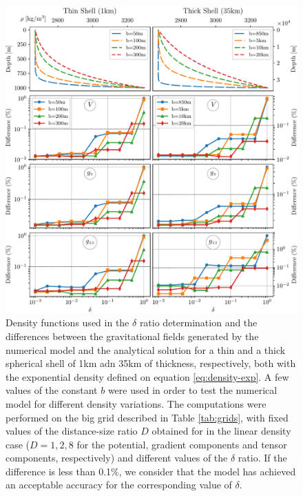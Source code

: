 \documentclass[extra]{gji}
\begin{document}
\begin{figure}
\centering
\includegraphics[width=\linewidth]{figures/exponential-delta.pdf}
\caption{
    Density functions used in the $\delta$ ratio determination and the 
    differences between the gravitational fields generated by the 
    numerical model and the analytical solution for a thin and a thick 
    spherical shell of 1km adn 35km of thickness, respectively, both 
    with the exponential density defined on equation 
    \ref{eq:density-exp}.
    A few values of the constant $b$ were used in order to test the 
    numerical model for different density variations.
    The computations were performed on the big grid described in 
    Table \ref{tab:grids}, with fixed values of the distance-size ratio 
    $D$ obtained for in the linear density case ($D=1, 2, 8$ for the 
    potential, gradient components and tensor components, respectively)
    and different values of the $\delta$ ratio.
    If the difference is less than 0.1\%, we consider that the model 
    has achieved an acceptable accuracy for the corresponding value of 
    $\delta$.
    }
\label{fig:delta-exponential}
\end{figure}


\end{document}
